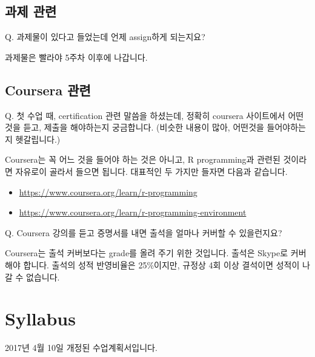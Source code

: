 \documentclass[10pt,]{krantz}
\providecommand{\tightlist}{%
  \setlength{\itemsep}{0pt}\setlength{\parskip}{0pt}}
\renewenvironment{quote}{\begin{VF}}{\end{VF}}
\theoremstyle{definition}
\theoremstyle{definition}
\theoremstyle{remark}
\begin{document}
\subsection*{과제 관련}\label{-}


\begin{quote}
Q. 과제물이 있다고 들었는데 언제 assign하게 되는지요?
\end{quote}

과제물은 빨라야 5주차 이후에 나갑니다.

\subsection*{Coursera 관련}\label{coursera-}


\begin{quote}
Q. 첫 수업 때, certification 관련 말씀을 하셨는데, 정확히 coursera
사이트에서 어떤 것을 듣고, 제출을 해야하는지 궁금합니다. (비슷한 내용이
많아, 어떤것을 들어야하는지 헷갈립니다.) 
\end{quote}

Coursera는 꼭 어느 것을 들어야 하는 것은 아니고, R programming과 관련된
것이라면 자유로이 골라서 들으면 됩니다. 대표적인 두 가지만 들자면 다음과
같습니다.

\begin{itemize}
\tightlist
\item
  \url{https://www.coursera.org/learn/r-programming}
\item
  \url{https://www.coursera.org/learn/r-programming-environment}
\end{itemize}

\begin{quote}
Q. Coursera 강의를 듣고 증명서를 내면 출석을 얼마나 커버할 수
있을런지요?
\end{quote}

Coursera는 출석 커버보다는 grade를 올려 주기 위한 것입니다. 출석은
Skype로 커버해야 합니다. 출석의 성적 반영비율은 25\%이지만, 규정상 4회
이상 결석이면 성적이 나갈 수 없습니다.

\section*{Syllabus}\label{syllabus}


2017년 4월 10일 개정된 수업계획서입니다.
\end{document}
